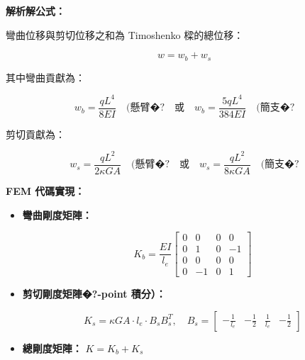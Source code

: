 \documentclass[UTF8, a4paper, 12pt]{ctexart}
\begin{document}
\textbf{解析解公式：}

彎曲位移與剪切位移之和為 Timoshenko 樑的總位移：

\begin{equation}

    w = w_b + w_s

\end{equation}



其中彎曲貢獻為：

\begin{equation}

    w_b = \frac{qL^4}{8EI} \quad \text{(懸臂�?} \quad \text{或} \quad w_b = \frac{5qL^4}{384EI} \quad \text{(簡支�?}

\end{equation}



剪切貢獻為：

\begin{equation}

    w_s = \frac{qL^2}{2\kappa GA} \quad \text{(懸臂�?} \quad \text{或} \quad w_s = \frac{qL^2}{8\kappa GA} \quad \text{(簡支�?}

\end{equation}



\textbf{FEM 代碼實現：}

\begin{itemize}

    \item \textbf{彎曲剛度矩陣：}

    \begin{equation}

        K_b = \frac{EI}{l_e} \begin{bmatrix} 0 & 0 & 0 & 0 \\ 0 & 1 & 0 & -1 \\ 0 & 0 & 0 & 0 \\ 0 & -1 & 0 & 1 \end{bmatrix}

    \end{equation}

    \item \textbf{剪切剛度矩陣�?-point 積分）：}

    \begin{equation}

        K_s = \kappa GA \cdot l_e \cdot B_s B_s^T, \quad B_s = \begin{bmatrix} -\frac{1}{l_e} & -\frac{1}{2} & \frac{1}{l_e} & -\frac{1}{2} \end{bmatrix}

    \end{equation}

    \item \textbf{總剛度矩陣：} $K = K_b + K_s$

\end{itemize}
\end{document}
